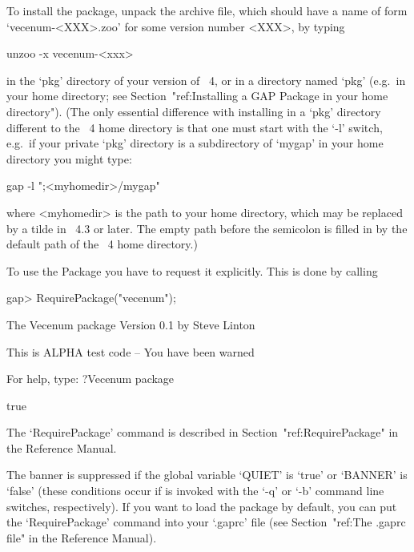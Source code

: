 


To install the {\Vecenum} package, unpack the archive file, which  should
have a name of form `vecenum-<XXX>.zoo' for some version number <XXX>, by
typing

unzoo -x vecenum-<xxx>

in the `pkg' directory of your version of {\GAP}~4,  or  in  a  directory
named `pkg' (e.g.~in your home directory; see  Section~"ref:Installing  a
GAP Package in your home directory"). (The only essential difference with
installing {\Vecenum} in a `pkg' directory different to the {\GAP}~4 home
directory is that one must start {\GAP} with  the  `-l'  switch,  e.g.~if
your private `pkg' directory is a subdirectory of `mygap'  in  your  home
directory you might type:

gap -l ";<myhomedir>/mygap"

where <myhomedir> is the path  to  your  home  directory,  which  may  be
replaced by a tilde in {\GAP}~4.3 or later. The  empty  path  before  the
semicolon is  filled  in  by  the  default  path  of  the  {\GAP}~4  home
directory.)



To use the {\Vecenum} Package you have to request it explicitly. This  is
done by calling

\beginexample
gap> RequirePackage("vecenum");

           The Vecenum package
               Version 0.1    
            by Steve Linton

     This is ALPHA test code -- You have been warned
	
     For help, type: ?Vecenum package


true
\endexample

The `RequirePackage' command is described in Section~"ref:RequirePackage"
in the {\GAP} Reference Manual.

The banner is suppressed if the global {\GAP} variable `QUIET' is  `true'
or `BANNER' is `false' (these conditions occur if {\GAP} is invoked  with
the `-q' or `-b' command line switches, respectively).  If  you  want  to
load the {\Vecenum} package by default, you can put the  `RequirePackage'
command into your `.gaprc' file (see Section~"ref:The .gaprc file" in the
{\GAP} Reference Manual).

